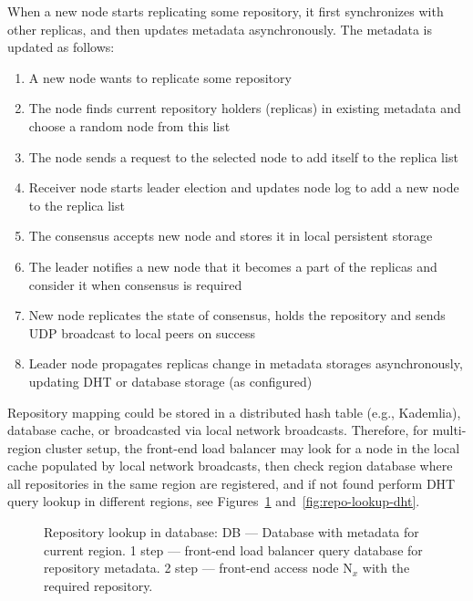 \documentclass[acmlarge, screen, nonacm, 11pt]{acmart}
\begin{document}
When a new node starts replicating some repository, it first synchronizes with other replicas, and then
updates metadata asynchronously. The metadata is updated as follows:
\begin{enumerate}
  \item A new node wants to replicate some repository
  \item The node finds current repository holders (replicas) in existing metadata and choose a random node from this list
  \item The node sends a request to the selected node to add itself to the replica list
  \item Receiver node starts leader election and updates node log to add a new node to the replica list
  \item The consensus accepts new node and stores it in local persistent storage
  \item The leader notifies a new node that it becomes a part of the replicas and consider it when consensus is required
  \item New node replicates the state of consensus, holds the repository and sends UDP broadcast to
    local peers on success
  \item Leader node propagates replicas change in metadata storages asynchronously, updating DHT or database storage
    (as configured)
\end{enumerate}

Repository mapping could be stored in a distributed hash table (e.g., Kademlia),
database cache, or broadcasted via local network broadcasts.
Therefore, for multi-region cluster setup, the front-end load balancer may look for a node in the local cache
populated by local network broadcasts, then check region database where all repositories in the same region are
registered, and if not found perform DHT query lookup in different regions,
see Figures~\ref{fig:repo-lookup-db} and~\ref{fig:repo-lookup-dht}.

\begin{figure}
  \begin{center}
  \end{center}
  \caption{
    Repository lookup in database:
    DB --- Database with metadata for current region.
    1 step --- front-end load balancer query database for repository metadata.
    2 step --- front-end access node N$_{x}$ with the required repository.
  }\label{fig:repo-lookup-db}
\end{figure}
\end{document}

